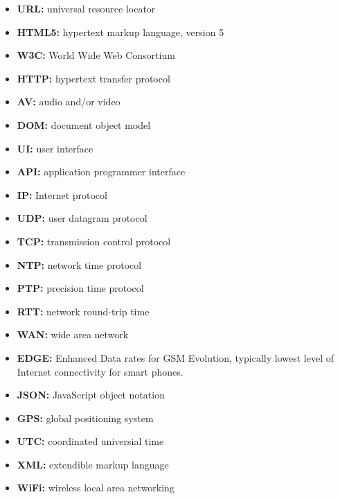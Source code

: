 \begin{itemize}
\item{\textbf{URL:} universal resource locator}
\item{\textbf{HTML5:} hypertext markup language, version 5}
\item{\textbf{W3C:} World Wide Web Consortium}
\item{\textbf{HTTP:} hypertext transfer protocol}
\item{\textbf{AV:} audio and/or video}
\item{\textbf{DOM:} document object model}
\item{\textbf{UI:} user interface}
\item{\textbf{API:} application programmer interface}
\item{\textbf{IP:} Internet protocol}
\item{\textbf{UDP:} user datagram protocol}
\item{\textbf{TCP:} transmission control protocol}
\item{\textbf{NTP:} network time protocol}
\item{\textbf{PTP:} precision time protocol}
\item{\textbf{RTT:} network round-trip time}
\item{\textbf{WAN:} wide area network}
\item{\textbf{EDGE:} Enhanced Data rates for GSM Evolution, typically lowest level of Internet connectivity for smart phones.}
\item{\textbf{JSON:} JavaScript object notation}
\item{\textbf{GPS:} global positioning system}
\item{\textbf{UTC:} coordinated universial time}
\item{\textbf{XML:} extendible markup language}
\item{\textbf{WiFi:} wireless local area networking}
\end{itemize}
